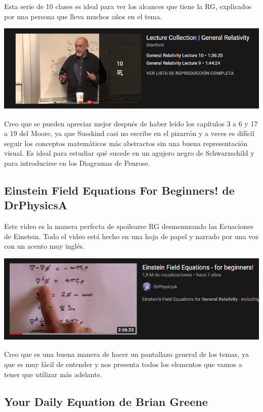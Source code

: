 Esta serie de 10 clases es ideal para ver los alcances que tiene la RG, explicados por una persona que lleva muchos años en el tema.
\begin{marginfigure}
\includegraphics[width=1.3\textwidth]{Im/susskind.png}
\end{marginfigure}
Creo que se pueden apreciar mejor después de haber leído los capítulos 3 a 6 y 17 a 19 del Moore, ya que Susskind casi no escribe en el pizarrón y a veces es difícil seguir los conceptos matemáticos más abstractos sin una buena representación visual. Es ideal para estudiar qué sucede en un agujero negro de Schwarzschild y para introducirse en los Diagramas de Penrose.

\subsection*{\textbf{Einstein Field Equations For Beginners!} de DrPhysicsA}

Este video es la manera perfecta de spoilearse RG desmenuzando las Ecuaciones de Einstein. Todo el video está hecho en una hoja de papel y narrado por una voz con un acento muy inglés. 
\begin{marginfigure}
\includegraphics[width=1.3\textwidth]{Im/bumpyy.png}
\end{marginfigure}
Creo que es una buena manera de hacer un pantallazo general de los temas, ya que es muy fácil de entender y nos presenta todos los elementos que vamos a tener que utilizar más adelante.

\subsection*{\textbf{Your Daily Equation} de Brian Greene}

